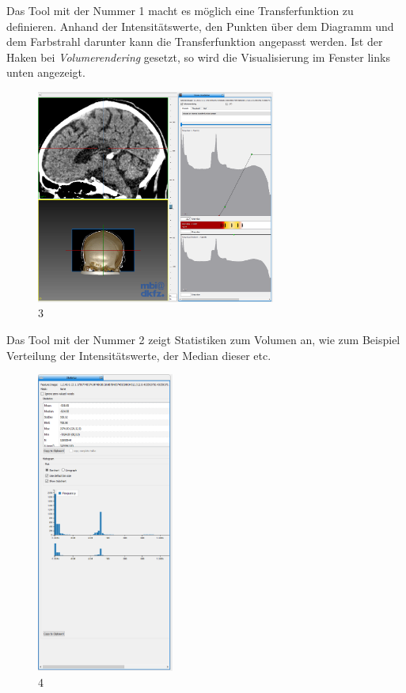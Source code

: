 Das Tool mit der Nummer 1 macht es möglich eine Transferfunktion zu definieren. Anhand der Intensitätswerte, den Punkten über dem Diagramm und dem Farbstrahl darunter kann die Transferfunktion angepasst werden. Ist der Haken bei \textit{Volumerendering} gesetzt, so wird die Visualisierung im Fenster links unten angezeigt.

\begin{figure}[H] 
\centering 
\includegraphics[width=0.7\textwidth]{Logos/MITK_Doku/3.PNG}
\caption{3} 
\label{fig:drei} 
\end{figure}

Das Tool mit der Nummer 2 zeigt Statistiken zum Volumen an, wie zum Beispiel Verteilung der Intensitätswerte, der Median dieser etc.

\begin{figure}[H] 
\centering 
\includegraphics[width=0.4\textwidth]{Logos/MITK_Doku/4.PNG}
\caption{4} 
\label{fig:vier} 
\end{figure}

